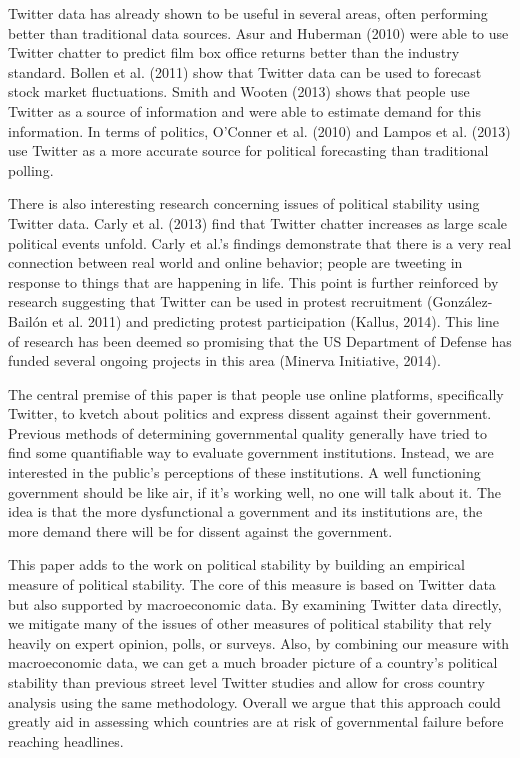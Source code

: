 \documentclass[12pt]{article}
\begin{document}
\begin{spacing}{1.5}
Twitter data has already shown to be useful in several areas, often performing better than traditional data sources. Asur and Huberman (2010) were able to use Twitter chatter to predict film box office returns better than the industry standard. Bollen et al. (2011) show that Twitter data can be used to forecast stock market fluctuations. Smith and Wooten (2013) shows that people use Twitter as a source of information and were able to estimate demand for this information. In terms of politics, O'Conner et al. (2010) and Lampos et al. (2013) use Twitter as a more accurate source for political forecasting than traditional polling. 

There is also interesting research concerning issues of political stability using Twitter data. Carly et al. (2013) find that Twitter chatter increases as large scale political events unfold. Carly et al.'s findings demonstrate that there is a very real connection between real world and online behavior; people are tweeting in response to things that are happening in life. This point is further reinforced by research suggesting that Twitter can be used in protest recruitment (Gonz{\'a}lez-Bail{\'o}n et al. 2011) and predicting protest participation (Kallus, 2014). This line of research has been deemed so promising that the US Department of Defense has funded several ongoing projects in this area (Minerva Initiative, 2014).  

The central premise of this paper is that people use online platforms, specifically Twitter, to kvetch about politics and express dissent against their government. Previous methods of determining governmental quality generally have tried to find some quantifiable way to evaluate government institutions. Instead, we are interested in the public's perceptions of these institutions. A well functioning government should be like air, if it's working well, no one will talk about it. The idea is that the more dysfunctional a government and its institutions are, the more demand there will be for dissent against the government.  

This paper adds to the work on political stability by building an empirical measure of political stability. The core of this measure is based on Twitter data but also supported by macroeconomic data. By examining Twitter data directly, we mitigate many of the issues of other measures of political stability that rely heavily on expert opinion, polls, or surveys. Also, by combining our measure with macroeconomic data, we can get a much broader picture of a country's political stability than previous street level Twitter studies and allow for cross country analysis using the same methodology. Overall we argue that this approach could greatly aid in assessing which countries are at risk of governmental failure before reaching headlines.   


\end{spacing}
\end{document}
